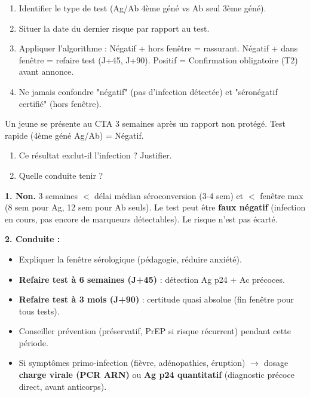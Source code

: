 \documentclass[11pt]{article}
\begin{document}
\begin{methode}
\begin{enumerate}
\item Identifier le type de test (Ag/Ab 4ème géné vs Ab seul 3ème géné).
\item Situer la date du dernier risque par rapport au test.
\item Appliquer l'algorithme : Négatif + hors fenêtre = rassurant. Négatif + dans fenêtre = refaire test (J+45, J+90). Positif = Confirmation obligatoire (T2) avant annonce.
\item Ne jamais confondre "négatif" (pas d'infection détectée) et "séronégatif certifié" (hors fenêtre).
\end{enumerate}
\end{methode}

\begin{exoresolu}
Un jeune se présente au CTA 3 semaines après un rapport non protégé. Test rapide (4ème géné Ag/Ab) = Négatif.
\begin{enumerate}
\item Ce résultat exclut-il l'infection ? Justifier.
\item Quelle conduite tenir ?
\end{enumerate}
\tcblower
\textbf{1. Non.} 3 semaines $<$ délai médian séroconversion (3-4 sem) et $<$ fenêtre max (8 sem pour Ag, 12 sem pour Ab seuls). Le test peut être \textbf{faux négatif} (infection en cours, pas encore de marqueurs détectables). Le risque n'est pas écarté.

\textbf{2. Conduite :}
\begin{itemize}
\item Expliquer la fenêtre sérologique (pédagogie, réduire anxiété).
\item \textbf{Refaire test à 6 semaines (J+45)} : détection Ag p24 + Ac précoces.
\item \textbf{Refaire test à 3 mois (J+90)} : certitude quasi absolue (fin fenêtre pour tous tests).
\item Conseiller prévention (préservatif, PrEP si risque récurrent) pendant cette période.
\item Si symptômes primo-infection (fièvre, adénopathies, éruption) $\rightarrow$ dosage \textbf{charge virale (PCR ARN)} ou \textbf{Ag p24 quantitatif} (diagnostic précoce direct, avant anticorps).
\end{itemize}
\end{exoresolu}
\end{document}
